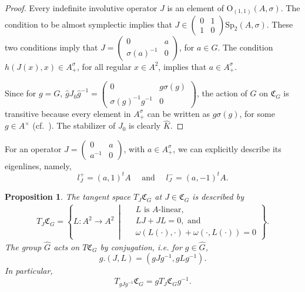 \documentclass[oneside,11pt]{amsart}
\newtheorem{prop}[thm]{Proposition}
\theoremstyle{definition}
\theoremstyle{remark}
\newcommand{\midwd}{\,\middle\vert\,}
\numberwithin{thm}{section}
\numberwithin{equation}{section}
\begin{document}
\begin{proof}
    Every indefinite involutive operator $J$ is an element of $\mathrm{O}_{(1,1)}(A,\sigma)$. The condition to be almost symplectic implies that $J\in\begin{pmatrix}
        0 & 1 \\
        1 & 0
    \end{pmatrix}\mathrm{Sp}_2(A,\sigma)$.    
    These two conditions imply that $J=\begin{pmatrix}
        0 & a \\
        \sigma(a)^{-1} & 0
    \end{pmatrix}$, for $a\in G$.
    The condition $h(J(x),x)\in A^\sigma_+$, for all regular $x\in A^2$, implies that $a\in A^\sigma_+$.

\noindent Since for $g=G$, $\hat gJ_0\hat g^{-1}=\begin{pmatrix}
        0 & g\sigma(g) \\
        \sigma(g)^{-1}g^{-1} & 0
    \end{pmatrix}$, the action of $G$ on $\mathfrak{C}_G$ is transitive because every element in $A^\sigma_+$ can be written as $g\sigma(g)$, for some $g\in A^\times$ (cf.~\cite[Corollary 2.65]{ABRRW}). The stabilizer of $J_0$ is clearly $\hat K$.
\end{proof}

For an operator $J=\begin{pmatrix}
        0 & a \\
        a^{-1} & 0
    \end{pmatrix}$,  with $a\in A^\sigma_+$, we can explicitly describe its eigenlines, namely, \[l_J^+=(a,1)^tA \quad \text{ and } \quad l_J^-=(a,-1)^tA.\]  

\begin{prop}\label{prop:tangent_sio_A}
    The tangent space $T_J\mathfrak{C}_G$ at $J\in \mathfrak{C}_G$ is described by
    \begin{align*}
    T_J\mathfrak{C}_G=\left\{L\colon A^2\to A^2\midwd 
    \begin{aligned}
    &\ \text{$L$ is $A$-linear,}\\
    &\ LJ+JL=0,\text{ and}\\
    &\ \omega(L(\cdot),\cdot)+\omega(\cdot,L(\cdot))=0
    \end{aligned}
    \right\}.
    \end{align*}
    The group $\hat G$ acts on $T\mathfrak{C}_G$ by conjugation, i.e. for $g\in \hat G$,  
    $$
    g.(J,L)=(gJg^{-1},gLg^{-1}).
    $$ 
    In particular, 
    $$
    T_{gJg^{-1}}\mathfrak{C}_G = gT_J\mathfrak{C}_Gg^{-1}.
    $$
\end{prop}
\end{document}
